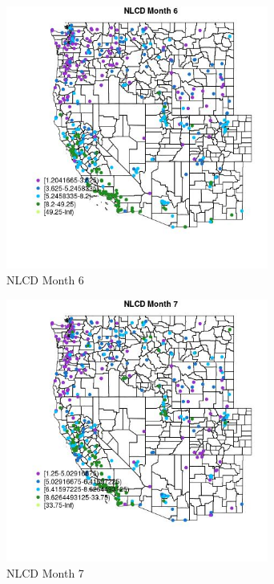 \begin{figure} 
\centering  
\includegraphics[width=0.77\textwidth]{Code_Outputs/ML_input_report_ML_input_PM25_Step5_part_d_de_duplicated_aves_ML_input_MapObsMo6NLCD.jpg} 
\caption{\label{fig:ML_input_report_ML_input_PM25_Step5_part_d_de_duplicated_aves_ML_inputMapObsMo6NLCD}NLCD Month 6} 
\end{figure} 
 

\begin{figure} 
\centering  
\includegraphics[width=0.77\textwidth]{Code_Outputs/ML_input_report_ML_input_PM25_Step5_part_d_de_duplicated_aves_ML_input_MapObsMo7NLCD.jpg} 
\caption{\label{fig:ML_input_report_ML_input_PM25_Step5_part_d_de_duplicated_aves_ML_inputMapObsMo7NLCD}NLCD Month 7} 
\end{figure} 
 

